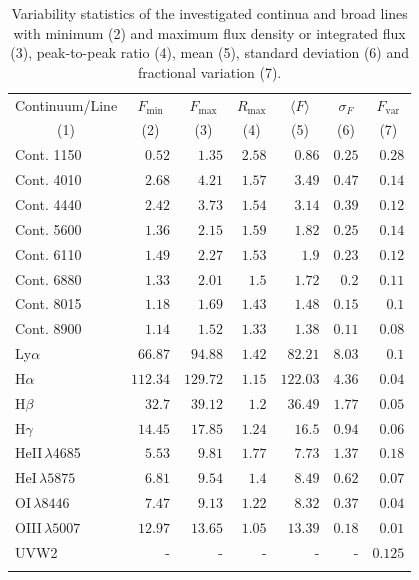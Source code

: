 \begin{table}[!htb] 
	\centering 
	\caption{Variability statistics of the investigated continua and broad lines with minimum (2) and maximum flux density or integrated flux (3), peak-to-peak ratio (4), mean (5), standard deviation (6) and fractional variation (7).} 
	\begin{tabular}{lrrrrrr} 
		\hline 
		\hline 
		Continuum/Line &  \multicolumn{1}{c}{$F_{\text{min}}$} &  \multicolumn{1}{c}{$F_{\text{max}}$} &  \multicolumn{1}{c}{$R_{\text{max}}$} &  \multicolumn{1}{c}{$\langle F \rangle$} &  \multicolumn{1}{c}{$\sigma_F$} &  \multicolumn{1}{c}{$F_{\text{var}}$} \\ 
		\multicolumn{1}{c}{(1)} & \multicolumn{1}{c}{(2)} & \multicolumn{1}{c}{(3)} & \multicolumn{1}{c}{(4)} & \multicolumn{1}{c}{(5)} & \multicolumn{1}{c}{(6)} & \multicolumn{1}{c}{(7)} \\ 
		\hline
		Cont. 1150  & $0.52$ & $1.35$ & $2.58$ & $0.86$ & $0.25$ & $0.28$ \\
		Cont. 4010  & $2.68$ & $4.21$ & $1.57$ & $3.49$ & $0.47$ & $0.14$ \\
		Cont. 4440  & $2.42$ & $3.73$ & $1.54$ & $3.14$ & $0.39$ & $0.12$ \\
		Cont. 5600  & $1.36$ & $2.15$ & $1.59$ & $1.82$ & $0.25$ & $0.14$ \\
		Cont. 6110  & $1.49$ & $2.27$ & $1.53$ & $1.9$ & $0.23$ & $0.12$ \\
		Cont. 6880  & $1.33$ & $2.01$ & $1.5$ & $1.72$ & $0.2$ & $0.11$ \\
		Cont. 8015  & $1.18$ & $1.69$ & $1.43$ & $1.48$ & $0.15$ & $0.1$ \\
		Cont. 8900  & $1.14$ & $1.52$ & $1.33$ & $1.38$ & $0.11$ & $0.08$ \\
		\hline 
		Ly$\alpha$  & $66.87$ & $94.88$ & $1.42$ & $82.21$ & $8.03$ & $0.1$ \\
		H$\alpha$  & $112.34$ & $129.72$ & $1.15$ & $122.03$ & $4.36$ & $0.04$ \\
		H$\beta$  & $32.7$ & $39.12$ & $1.2$ & $36.49$ & $1.77$ & $0.05$ \\
		H$\gamma$  & $14.45$ & $17.85$ & $1.24$ & $16.5$ & $0.94$ & $0.06$ \\
		HeII$\,\lambda$4685  & $5.53$ & $9.81$ & $1.77$ & $7.73$ & $1.37$ & $0.18$ \\
		HeI$\,\lambda5875$  & $6.81$ & $9.54$ & $1.4$ & $8.49$ & $0.62$ & $0.07$ \\
		OI$\,\lambda 8446$ & $7.47$ & $9.13$ & $1.22$ & $8.32$ & $0.37$ & $0.04$ \\
		\hline
		OIII$\,\lambda 5007$  & $12.97$ & $13.65$ & $1.05$ & $13.39$ & $0.18$ & $0.01$ \\
		\hline 
		UVW2 & - & - & - & - & - & $0.125$ \\
		\hline 
		\hline 
		\label{tab:varstatistics} 
	\end{tabular} 
	
\end{table}
\newpage


